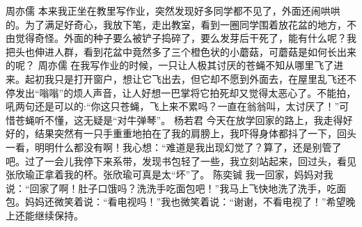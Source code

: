 {}\markdownRendererInterblockSeparator
{}周亦儒\markdownRendererInterblockSeparator
{}本来我正坐在教里写作业，突然发现好多同学都不见了，外面还闹哄哄的。为了满足好奇心，我放下笔，走出教室，看到一圈同学围着放花盆的地方，不由觉得奇怪。外面的种子要么被铲子捣碎了，要么发芽后干死了，能有什么呢？我把头也伸进人群，看到花盆中竟然多了三个橙色状的小蘑菇，可蘑菇是如何长出来的呢？ \markdownRendererInterblockSeparator
{}\markdownRendererInterblockSeparator
{}周亦儒\markdownRendererInterblockSeparator
{}在我写作业的时候，一只让人极其讨厌的苍蝇不知从哪里飞了进来。起初我只是打开窗户，想让它飞出去，但它却不愿到外面去，在屋里乱飞还不停发出“嗡嗡”的烦人声音，让人好想一巴掌将它拍死却又觉得太恶心了。不能拍，吼两句还是可以的:“你这只苍蝇，飞上来不累吗？一直在翁翁叫，太讨厌了！”可惜苍蝇听不懂，这无疑是“对牛弹琴”。\markdownRendererInterblockSeparator
{}\markdownRendererInterblockSeparator
{}杨若君\markdownRendererInterblockSeparator
{}今天在放学回家的路上，我走得好好的，结果突然有一只手重重地拍在了我的肩膀上，我吓得身体都抖了一下，回头一看，明明什么都没有啊！我心想：“难道是我出现幻觉了？算了，还是别管了吧。过了一会儿我停下来系带，发现书包轻了一些，我立刻站起来，回过头，看见张欣瑜正拿着我的杯。张欣瑜可真是太“坏”了。\markdownRendererInterblockSeparator
{}\markdownRendererInterblockSeparator
{}陈奕铖\markdownRendererInterblockSeparator
{}我一回家，妈妈对我说：“回家了啊！肚子口饿吗？洗洗手吃面包吧！”我马上飞快地洗了洗手，吃面包。妈妈还微笑着说：“看电视吗！”我也微笑着说：“谢谢，不看电视了！”希望晚上还能继续保持。\relax